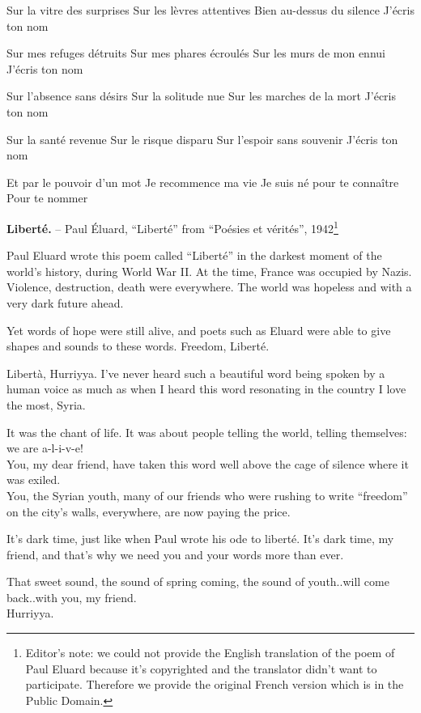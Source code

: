 Sur la vitre des surprises Sur les lèvres attentives Bien au-dessus du
silence J'écris ton nom

Sur mes refuges détruits Sur mes phares écroulés Sur les murs de mon
ennui J'écris ton nom

Sur l'absence sans désirs Sur la solitude nue Sur les marches de la mort
J'écris ton nom

Sur la santé revenue Sur le risque disparu Sur l'espoir sans souvenir
J'écris ton nom

Et par le pouvoir d'un mot Je recommence ma vie Je suis né pour te
connaître Pour te nommer

\textbf{Liberté.} -- Paul Éluard, ``Liberté'' from ``Poésies et
vérités'', 1942\footnote{Editor's note: we could not provide the English
  translation of the poem of Paul Eluard because it's copyrighted and
  the translator didn't want to participate. Therefore we provide the
  original French version which is in the Public Domain.}

Paul Eluard wrote this poem called ``Liberté'' in the darkest moment of
the world's history, during World War II. At the time, France was
occupied by Nazis. Violence, destruction, death were everywhere. The
world was hopeless and with a very dark future ahead.

Yet words of hope were still alive, and poets such as Eluard were able
to give shapes and sounds to these words. Freedom, Liberté.

Libertà, Hurriyya. I've never heard such a beautiful word being spoken
by a human voice as much as when I heard this word resonating in the
country I love the most, Syria.

It was the chant of life. It was about people telling the world, telling
themselves: we are a-l-i-v-e!\\
You, my dear friend, have taken this word well above the cage of silence
where it was exiled.\\
You, the Syrian youth, many of our friends who were rushing to write
``freedom'' on the city's walls, everywhere, are now paying the price.

It's dark time, just like when Paul wrote his ode to liberté. It's dark
time, my friend, and that's why we need you and your words more than
ever.

That sweet sound, the sound of spring coming, the sound of youth..will
come back..with you, my friend.\\
Hurriyya.

